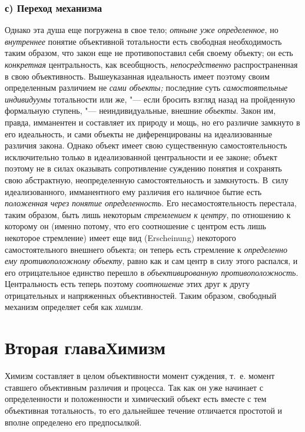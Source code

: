 \subsection[с) Переход механизма]{с) Переход механизма}
Однако эта душа еще погружена в свое тело;
{\em отныне уже определенное},
но {\em внутреннее}
понятие объективной тотальности есть свободная необходимость
таким образом, что закон еще не противопоставил себя своему объекту; он
есть {\em конкретная}
центральность, как всеобщность,
{\em непосредственно}
распространенная в свою объективность. Вышеуказанная
идеальность имеет поэтому своим определенным различием не
{\em сами объекты;}
последние суть
{\em самостоятельные индивидуумы}
тотальности или же, "--- если бросить взгляд
назад на пройденную формальную ступень, "--- неиндивидуальные,
внешние {\em объекты}.
Закон им, правда, имманентен и составляет их природу и мощь,
но его различие замкнуто в его идеальность, и сами объекты не
диференцированы на идеализованные различия закона. Однако объект имеет свою
существенную самостоятельность исключительно только в идеализованной
центральности и ее законе; объект поэтому не в силах оказывать
сопротивление суждению понятия и сохранять свою абстрактную, неопределенную
самостоятельность и замкнутость. В~силу идеализованного, имманентного ему
различия его наличное бытие есть
{\em положенная}
{\em через понятие определенность}.
Его несамостоятельность перестала, таким образом, быть лишь
некоторым {\em стремлением к центру},
по отношению к которому он (именно потому, что его
соотношение с центром есть лишь некоторое стремление) имеет еще вид
(Erscheinung) некоторого самостоятельного внешнего объекта;
он теперь есть стремление к
{\em определенно ему противоположному
объекту}, равно как и сам центр в силу этого распался, и его
отрицательное единство перешло в
{\em объективированную
противоположность}. Центральность есть теперь
поэтому
{\em соотношение} этих
друг к другу отрицательных и напряженных объективностей. Таким образом,
свободный механизм определяет себя как
{\em химизм}.

\chapter[Вторая глава Химизм]{Вторая глава\newline Химизм}
Химизм составляет в целом объективности момент суждения, т.~е.
момент ставшего объективным различия и процесса. Так как он уже начинает с
определенности и положенности и химический объект есть вместе с тем
объективная тотальность, то его дальнейшее течение отличается простотой и
вполне определено его предпосылкой.

